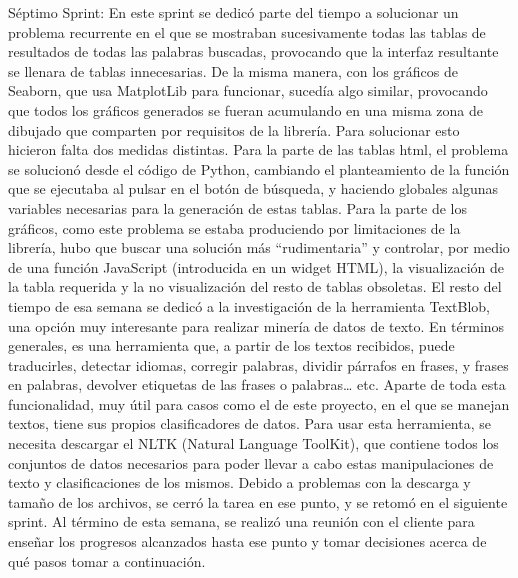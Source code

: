 Séptimo Sprint:
En este sprint se dedicó parte del tiempo a solucionar un problema recurrente en el que se mostraban sucesivamente todas las tablas de resultados de todas las palabras buscadas, provocando que la interfaz resultante se llenara de tablas innecesarias. De la misma manera, con los gráficos de Seaborn, que usa MatplotLib para funcionar, sucedía algo similar, provocando que todos los gráficos generados se fueran acumulando en una misma zona de dibujado que comparten por requisitos de la librería.
Para solucionar esto hicieron falta dos medidas distintas. Para la parte de las tablas html, el problema se solucionó desde el código de Python, cambiando el planteamiento de la función que se ejecutaba al pulsar en el botón de búsqueda, y haciendo globales algunas variables necesarias para la generación de estas tablas. Para la parte de los gráficos, como este problema se estaba produciendo por limitaciones de la librería, hubo que buscar una solución más “rudimentaria” y controlar, por medio de una función JavaScript (introducida en un widget HTML), la visualización de la tabla requerida y la no visualización del resto de tablas obsoletas.
El resto del tiempo de esa semana se dedicó a la investigación de la herramienta TextBlob, una opción muy interesante para realizar minería de datos de texto. En términos generales, es una herramienta que, a partir de los textos recibidos, puede traducirles, detectar idiomas, corregir palabras, dividir párrafos en frases, y frases en palabras, devolver etiquetas de las frases o palabras… etc. Aparte de toda esta funcionalidad, muy útil para casos como el de este proyecto, en el que se manejan textos, tiene sus propios clasificadores de datos. 
Para usar esta herramienta, se necesita descargar el NLTK (Natural Language ToolKit), que contiene todos los conjuntos de datos necesarios para poder llevar a cabo estas manipulaciones de texto y clasificaciones de los mismos. 
Debido a problemas con la descarga y tamaño de los archivos, se cerró la tarea en ese punto, y se retomó en el siguiente sprint.
Al término de esta semana, se realizó una reunión con el cliente para enseñar los progresos alcanzados hasta ese punto y tomar decisiones acerca de qué pasos tomar a continuación. 

